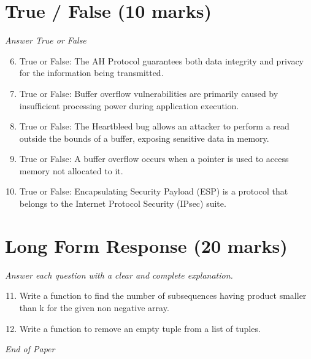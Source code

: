 \documentclass[12pt]{article}
\begin{document}
\section*{True / False (10 marks)}
\textit{Answer True or False}
\begin{enumerate}[label=\arabic*.]
\setcounter{enumi}{5}
\item True or False: The AH Protocol guarantees both data integrity and privacy for the information being transmitted.
\item True or False: Buffer overflow vulnerabilities are primarily caused by insufficient processing power during application execution.
\item True or False: The Heartbleed bug allows an attacker to perform a read outside the bounds of a buffer, exposing sensitive data in memory.
\item True or False: A buffer overflow occurs when a pointer is used to access memory not allocated to it.
\item True or False: Encapsulating Security Payload (ESP) is a protocol that belongs to the Internet Protocol Security (IPsec) suite.
\end{enumerate}

\section*{Long Form Response (20 marks)}
\textit{Answer each question with a clear and complete explanation.}
\begin{enumerate}[label=\arabic*.]
\setcounter{enumi}{10}
\item Write a function to find the number of subsequences having product smaller than k for the given non negative array.
\item Write a function to remove an empty tuple from a list of tuples.
\end{enumerate}

\vfill
\noindent\textit{End of Paper}
\end{document}
